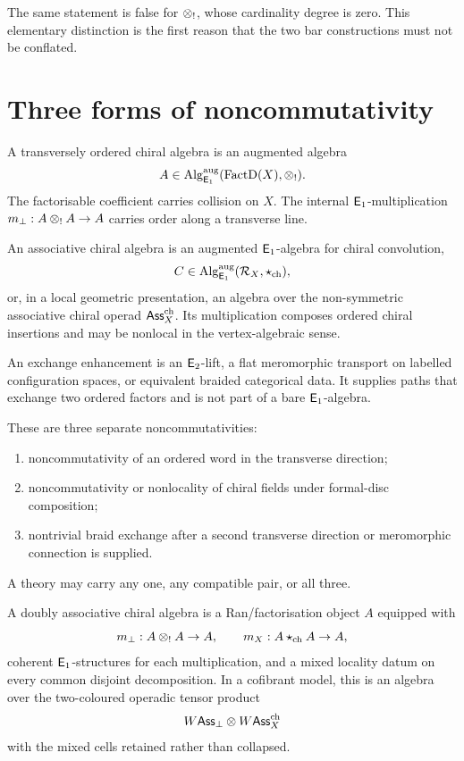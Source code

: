 The same statement is false for \(\mathbin{\otimes_{!}}\), whose cardinality degree is zero.  This elementary distinction is the first reason that the two bar constructions must not be conflated.

\section{Three forms of noncommutativity}
\begin{definition}
A transversely ordered chiral algebra is an augmented algebra
\[
 A\in\operatorname{Alg}^{\mathrm{aug}}_{\mathsf E_1}(\operatorname{FactD}(X),\mathbin{\otimes_{!}}).
\]
The factorisable coefficient carries collision on \(X\).  The internal \(\mathsf E_1\)-multiplication \(m_\perp:A\mathbin{\otimes_{!}} A\to A\) carries order along a transverse line.
\end{definition}

\begin{definition}
An associative chiral algebra is an augmented \(\mathsf E_1\)-algebra for chiral convolution,
\[
 C\in\operatorname{Alg}^{\mathrm{aug}}_{\mathsf E_1}(\mathcal R_X,\mathbin{\star_{\mathrm{ch}}}),
\]
or, in a local geometric presentation, an algebra over the non-symmetric associative chiral operad \(\mathsf{Ass}^{\mathrm{ch}}_X\).  Its multiplication composes ordered chiral insertions and may be nonlocal in the vertex-algebraic sense.
\end{definition}

\begin{definition}
An exchange enhancement is an \(\mathsf E_2\)-lift, a flat meromorphic transport on labelled configuration spaces, or equivalent braided categorical data.  It supplies paths that exchange two ordered factors and is not part of a bare \(\mathsf E_1\)-algebra.
\end{definition}

These are three separate noncommutativities:
\begin{enumerate}
\item noncommutativity of an ordered word in the transverse direction;
\item noncommutativity or nonlocality of chiral fields under formal-disc composition;
\item nontrivial braid exchange after a second transverse direction or meromorphic connection is supplied.
\end{enumerate}
A theory may carry any one, any compatible pair, or all three.

\begin{definition}\label{def:double-e1}
A doubly associative chiral algebra is a Ran/factorisation object \(A\) equipped with
\[
 m_\perp:A\mathbin{\otimes_{!}} A\to A,
 \qquad
 m_X:A\mathbin{\star_{\mathrm{ch}}} A\to A,
\]
coherent \(\mathsf E_1\)-structures for each multiplication, and a mixed locality datum on every common disjoint decomposition.  In a cofibrant model, this is an algebra over the two-coloured operadic tensor product
\[
 W\mathsf{Ass}_\perp\otimes W\mathsf{Ass}^{\mathrm{ch}}_X
\]
with the mixed cells retained rather than collapsed.
\end{definition}

